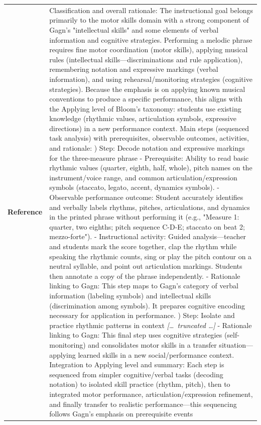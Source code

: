 \begin{longtable}{@{}l p{13cm}@{}}
  \textbf{Reference} & Classification and overall rationale: \newline The instructional goal belongs primarily to the motor skills domain with a strong component of Gagn's "intellectual skills" and some elements of verbal information and cognitive strategies. Performing a melodic phrase requires fine motor coordination (motor skills), applying musical rules (intellectual skills---discriminations and rule application), remembering notation and expressive markings (verbal information), and using rehearsal/monitoring strategies (cognitive strategies). Because the emphasis is on applying known musical conventions to produce a specific performance, this aligns with the Applying level of Bloom's taxonomy: students use existing knowledge (rhythmic values, articulation symbols, expressive directions) in a new performance context. \newline Main steps (sequenced task analysis) with prerequisites, observable outcomes, activities, and rationale: \newline 1) Step: Decode notation and expressive markings for the three-measure phrase \newline - Prerequisite: Ability to read basic rhythmic values (quarter, eighth, half, whole), pitch names on the instrument/voice range, and common articulation/expression symbols (staccato, legato, accent, dynamics symbols). \newline - Observable performance outcome: Student accurately identifies and verbally labels rhythms, pitches, articulations, and dynamics in the printed phrase without performing it (e.g., "Measure 1: quarter, two eighths; pitch sequence C-D-E; staccato on beat 2; mezzo-forte"). \newline - Instructional activity: Guided analysis---teacher and students mark the score together, clap the rhythm while speaking the rhythmic counts, sing or play the pitch contour on a neutral syllable, and point out articulation markings. Students then annotate a copy of the phrase independently. \newline - Rationale linking to Gagn: This step maps to Gagn's category of verbal information (labeling symbols) and intellectual skills (discrimination among symbols). It prepares cognitive encoding necessary for application in performance. \newline 2) Step: Isolate and practice rhythmic patterns in context \newline \textit{[\ldots\ truncated \ldots]} \newline - Rationale linking to Gagn: This final step uses cognitive strategies (self-monitoring) and consolidates motor skills in a transfer situation---applying learned skills in a new social/performance context. \newline Integration to Applying level and summary: \newline Each step is sequenced from simpler cognitive/verbal tasks (decoding notation) to isolated skill practice (rhythm, pitch), then to integrated motor performance, articulation/expression refinement, and finally transfer to realistic performance---this sequencing follows Gagn's emphasis on prerequisite events 
\end{longtable}
